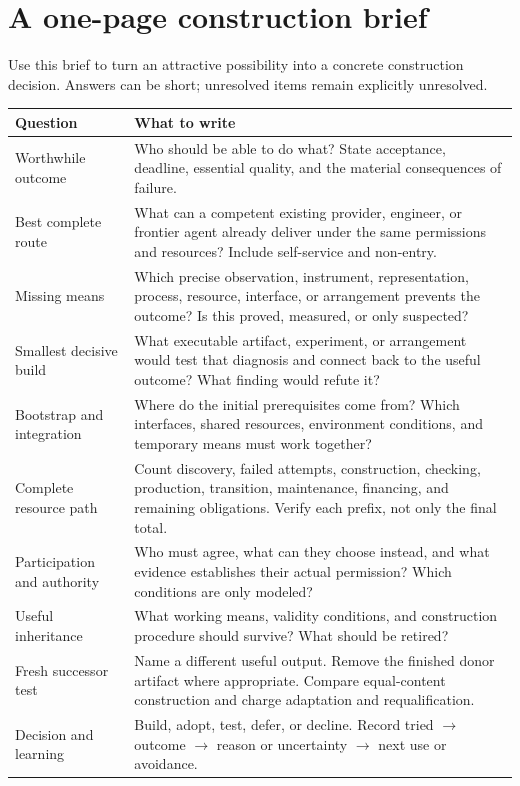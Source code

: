 \clearpage
\appendix
\section{A one-page construction brief}
\label{app:brief}

Use this brief to turn an attractive possibility into a concrete construction decision. Answers can be short; unresolved items remain explicitly unresolved.

\begin{longtable}{@{}P{1.55in}P{4.95in}@{}}
\toprule
\textbf{Question} & \textbf{What to write}\\
\midrule
\endhead
Worthwhile outcome & Who should be able to do what? State acceptance, deadline, essential quality, and the material consequences of failure.\\[.4em]
Best complete route & What can a competent existing provider, engineer, or frontier agent already deliver under the same permissions and resources? Include self-service and non-entry.\\[.4em]
Missing means & Which precise observation, instrument, representation, process, resource, interface, or arrangement prevents the outcome? Is this proved, measured, or only suspected?\\[.4em]
Smallest decisive build & What executable artifact, experiment, or arrangement would test that diagnosis and connect back to the useful outcome? What finding would refute it?\\[.4em]
Bootstrap and integration & Where do the initial prerequisites come from? Which interfaces, shared resources, environment conditions, and temporary means must work together?\\[.4em]
Complete resource path & Count discovery, failed attempts, construction, checking, production, transition, maintenance, financing, and remaining obligations. Verify each prefix, not only the final total.\\[.4em]
Participation and authority & Who must agree, what can they choose instead, and what evidence establishes their actual permission? Which conditions are only modeled?\\[.4em]
Useful inheritance & What working means, validity conditions, and construction procedure should survive? What should be retired?\\[.4em]
Fresh successor test & Name a different useful output. Remove the finished donor artifact where appropriate. Compare equal-content construction and charge adaptation and requalification.\\[.4em]
Decision and learning & Build, adopt, test, defer, or decline. Record tried $\rightarrow$ outcome $\rightarrow$ reason or uncertainty $\rightarrow$ next use or avoidance.\\
\bottomrule
\end{longtable}

